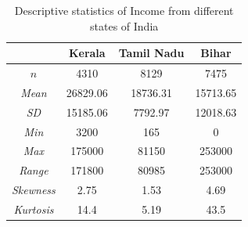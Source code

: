 \documentclass[11pt]{article}
\begin{document}
\begin{table}
    \centering
     \caption{Descriptive statistics of Income from different states of India}
    \begin{tabular}{cccc}
    \hline
    \hline
     &   Kerala & Tamil Nadu & Bihar \\
        \hline
    \hline

      $n$   & 4310&   8129& 7475\\
      \textit{Mean}  & 26829.06 &  18736.31&15713.65\\

      \textit{SD} & 15185.06 &  7792.97 & 12018.63 \\
     \textit{ Min }&  3200& 165 &0\\
      \textit{Max} & 175000&  81150 &253000\\
      \textit{Range} & 171800&  80985& 253000\\
      \textit{Skewness} &2.75  &  1.53& 4.69 \\
     \textit{Kurtosis} & 14.4 &  5.19 &43.5\\
      \hline

    \end{tabular}

    \label{tab:des}
\end{table}
\end{document}
